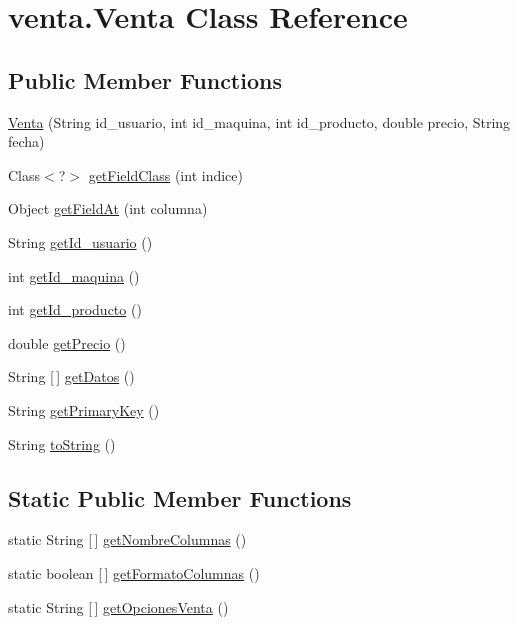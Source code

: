 \hypertarget{classventa_1_1_venta}{}\section{venta.\+Venta Class Reference}
\label{classventa_1_1_venta}
\subsection*{Public Member Functions}
\begin{DoxyCompactItemize}
\item 
\mbox{\hyperlink{classventa_1_1_venta_a3751727638406c6deadf9c0b8c1bac18}{Venta}} (String id\+\_\+usuario, int id\+\_\+maquina, int id\+\_\+producto, double precio, String fecha)
\item 
Class$<$?$>$ \mbox{\hyperlink{classventa_1_1_venta_ad2b7e54e1e88a1e3af3d72c11f4331cb}{get\+Field\+Class}} (int indice)
\item 
Object \mbox{\hyperlink{classventa_1_1_venta_a1b960ae8fc8ae2781ec32e46c2a9e78e}{get\+Field\+At}} (int columna)
\item 
String \mbox{\hyperlink{classventa_1_1_venta_a4ff2b190dba80f9bf653e24e0b820e54}{get\+Id\+\_\+usuario}} ()
\item 
int \mbox{\hyperlink{classventa_1_1_venta_a07718971227218ff55a5cf0c44c03059}{get\+Id\+\_\+maquina}} ()
\item 
int \mbox{\hyperlink{classventa_1_1_venta_a85785872bbb69c39c36493c9ac0ef944}{get\+Id\+\_\+producto}} ()
\item 
double \mbox{\hyperlink{classventa_1_1_venta_a439c68a9611863ddf15f3e3d5ee4fb79}{get\+Precio}} ()
\item 
String \mbox{[}$\,$\mbox{]} \mbox{\hyperlink{classventa_1_1_venta_acaafd3ec90386bafcc605fdbb5de7a69}{get\+Datos}} ()
\item 
String \mbox{\hyperlink{classventa_1_1_venta_a7ae81f06ac0feabb86e70ae214f896f2}{get\+Primary\+Key}} ()
\item 
String \mbox{\hyperlink{classventa_1_1_venta_afc2a44f382c68fb42c3a04f4e4890b29}{to\+String}} ()
\end{DoxyCompactItemize}
\subsection*{Static Public Member Functions}
\begin{DoxyCompactItemize}
\item 
static String \mbox{[}$\,$\mbox{]} \mbox{\hyperlink{classventa_1_1_venta_a517a4e2b36e633e0adab951596a733ed}{get\+Nombre\+Columnas}} ()
\item 
static boolean \mbox{[}$\,$\mbox{]} \mbox{\hyperlink{classventa_1_1_venta_a82a6dd2795bd37dc1a72ffb5cb36a156}{get\+Formato\+Columnas}} ()
\item 
static String \mbox{[}$\,$\mbox{]} \mbox{\hyperlink{classventa_1_1_venta_a9e1fb21792aa11bcf6e5d85e4bc4444d}{get\+Opciones\+Venta}} ()
\end{DoxyCompactItemize}


